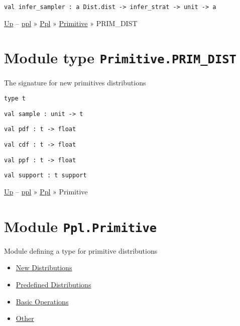 \protect\hyperlink{val-inferux5fsampler}{}\texttt{val\ infer\_sampler\ :\ \textquotesingle{}a\ Dist.dist\ -\textgreater{}\ infer\_strat\ -\textgreater{}\ unit\ -\textgreater{}\ \textquotesingle{}a}

\href{../index.html}{Up} -- \href{../../../index.html}{ppl} »
\href{../../index.html}{Ppl} » \href{../index.html}{Primitive} »
PRIM\_DIST

\section{\texorpdfstring{Module type
\texttt{Primitive.PRIM\_DIST}}{Module type Primitive.PRIM\_DIST}}\label{module-type-primitive.primux5fdist}

The signature for new primitives distributions

\protect\hyperlink{type-t}{}\texttt{type\ t}

\protect\hyperlink{val-sample}{}\texttt{val\ sample\ :\ unit\ -\textgreater{}\ t}

\protect\hyperlink{val-pdf}{}\texttt{val\ pdf\ :\ t\ -\textgreater{}\ float}

\protect\hyperlink{val-cdf}{}\texttt{val\ cdf\ :\ t\ -\textgreater{}\ float}

\protect\hyperlink{val-ppf}{}\texttt{val\ ppf\ :\ t\ -\textgreater{}\ float}

\protect\hyperlink{val-support}{}\texttt{val\ support\ :\ t\ support}

\href{../index.html}{Up} -- \href{../../index.html}{ppl} »
\href{../index.html}{Ppl} » Primitive

\section{\texorpdfstring{Module
\texttt{Ppl.Primitive}}{Module Ppl.Primitive}}\label{module-ppl.primitive}

Module defining a type for primitive distributions

\begin{itemize}
\tightlist
\item
  \protect\hyperlink{newux5fprim}{New Distributions}
\item
  \protect\hyperlink{inbuiltux5fdists}{Predefined Distributions}
\item
  \protect\hyperlink{basicux5fops}{Basic Operations}
\item
  \protect\hyperlink{primux5fother}{Other}
\end{itemize}

